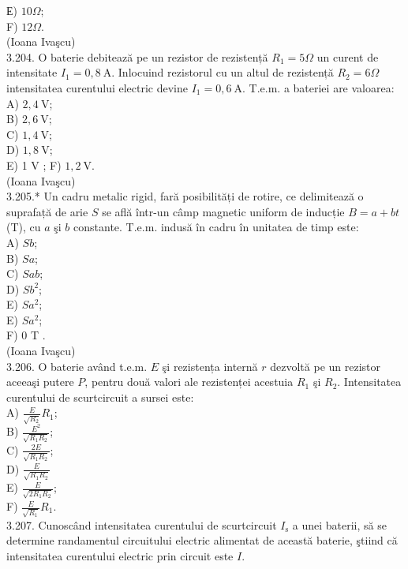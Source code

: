 \documentclass[10pt]{article}
\begin{document}
Е) $10 \Omega$;\\
F) $12 \Omega$.\\
(Ioana Ivaşcu)\\
3.204. O baterie debitează pe un rezistor de rezistență $R_{1}=5 \Omega$ un curent de intensitate $I_{1}=0,8 \mathrm{~A}$. Inlocuind rezistorul cu un altul de rezistență $R_{2}=6 \Omega$ intensitatea curentului electric devine $I_{1}=0,6 \mathrm{~A}$. T.e.m. a bateriei are valoarea:\\
A) $2,4 \mathrm{~V}$;\\
B) $2,6 \mathrm{~V}$;\\
C) $1,4 \mathrm{~V}$;\\
D) $1,8 \mathrm{~V}$;\\
E) 1 V ; F) $1,2 \mathrm{~V}$.\\
(Ioana Ivaşcu)\\
3.205.* Un cadru metalic rigid, fară posibilități de rotire, ce delimitează o suprafață de arie $S$ se află într-un câmp magnetic uniform de inducție $B=a+b t$ (T), cu $a$ şi $b$ constante. T.e.m. indusă în cadru în unitatea de timp este:\\
A) $S b$;\\
B) $S a$;\\
C) $S a b$;\\
D) $S b^{2}$;\\
E) $S a^{2}$;\\
E) $S a^{2}$;\\
F) 0 T .\\
(Ioana Ivaşcu)\\
3.206. O baterie având t.e.m. $E$ şi rezistența internă $r$ dezvoltă pe un rezistor aceeaşi putere $P$, pentru două valori ale rezistenței acestuia $R_{1}$ şi $R_{2}$. Intensitatea curentului de scurtcircuit a sursei este:\\
A) $\frac{E}{\sqrt{R_{2}}} R_{1}$;\\
B) $\frac{E^{2}}{\sqrt{R_{1} R_{2}}}$;\\
C) $\frac{2 E}{\sqrt{R_{1} R_{2}}}$;\\
D) $\frac{E}{\sqrt{R_{1} R_{2}}}$\\
E) $\frac{E}{\sqrt{2 R_{1} R_{2}}}$;\\
F) $\frac{E}{\sqrt{R_{1}}} R_{1}$.\\
3.207. Cunoscând intensitatea curentului de scurtcircuit $I_{\mathrm{s}}$ a unei baterii, să se determine randamentul circuitului electric alimentat de această baterie, ştiind că intensitatea curentului electric prin circuit este $I$.\\
\end{document}
